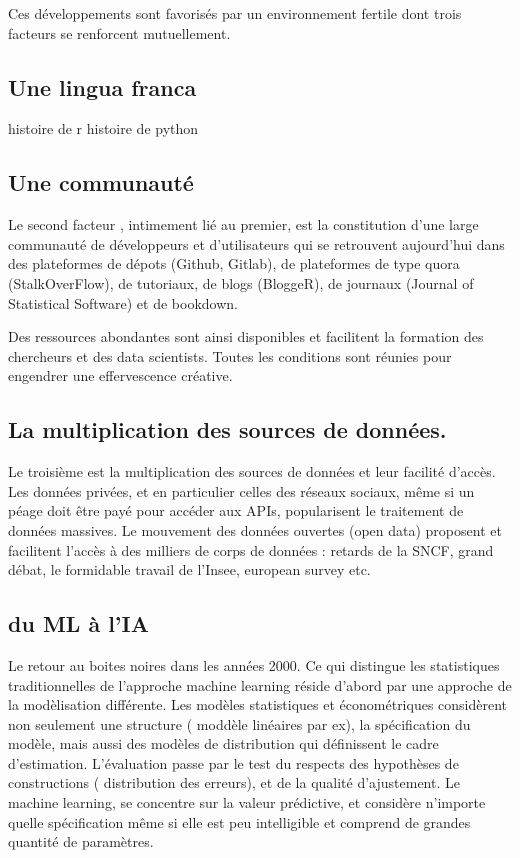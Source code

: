 \documentclass[
]{book}
\begin{document}
Ces développements sont favorisés par un environnement fertile dont trois facteurs se renforcent mutuellement.

\hypertarget{une-lingua-franca}{%
\subsection{Une lingua franca}\label{une-lingua-franca}}

histoire de r
histoire de python

\hypertarget{une-communautuxe9}{%
\subsection{Une communauté}\label{une-communautuxe9}}

Le second facteur , intimement lié au premier, est la constitution d'une large communauté de développeurs et d'utilisateurs qui se retrouvent aujourd'hui dans des plateformes de dépots (Github, Gitlab), de plateformes de type quora (StalkOverFlow), de tutoriaux, de blogs (BloggeR), de journaux (Journal of Statistical Software) et de bookdown.

Des ressources abondantes sont ainsi disponibles et facilitent la formation des chercheurs et des data scientists. Toutes les conditions sont réunies pour engendrer une effervescence créative.

\hypertarget{la-multiplication-des-sources-de-donnuxe9es.}{%
\subsection{La multiplication des sources de données.}\label{la-multiplication-des-sources-de-donnuxe9es.}}

Le troisième est la multiplication des sources de données et leur facilité d'accès. Les données privées, et en particulier celles des réseaux sociaux, même si un péage doit être payé pour accéder aux APIs, popularisent le traitement de données massives. Le mouvement des données ouvertes (open data) proposent et facilitent l'accès à des milliers de corps de données : retards de la SNCF, grand débat, le formidable travail de l'Insee, european survey etc.

\hypertarget{du-ml-uxe0-lia}{%
\subsection{du ML à l'IA}\label{du-ml-uxe0-lia}}

Le retour au boites noires dans les années 2000. Ce qui distingue les statistiques traditionnelles de l'approche machine learning réside d'abord par une approche de la modèlisation différente. Les modèles statistiques et économétriques considèrent non seulement une structure ( moddèle linéaires par ex), la spécification du modèle, mais aussi des modèles de distribution qui définissent le cadre d'estimation. L'évaluation passe par le test du respects des hypothèses de constructions ( distribution des erreurs), et de la qualité d'ajustement. Le machine learning, se concentre sur la valeur prédictive, et considère n'importe quelle spécification même si elle est peu intelligible et comprend de grandes quantité de paramètres.
\end{document}
